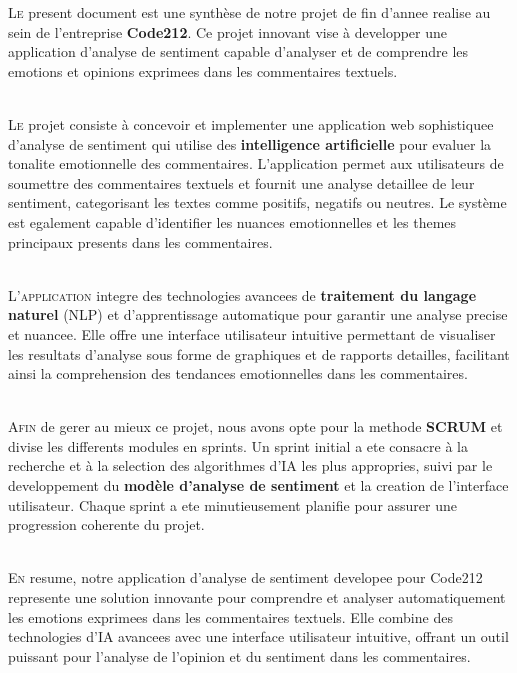 
\lettrine[nindent=0em, slope=.5em] {\color{Eblue}L}{e} present document est une synthèse de notre projet de fin d'annee realise au sein de l'entreprise \textbf{Code212}. Ce projet innovant vise à developper une application d'analyse de sentiment capable d'analyser et de comprendre les emotions et opinions exprimees dans les commentaires textuels.

\ \\

\lettrine[nindent=0em, slope=.5em] {\color{Eblue}L}{e} projet consiste à concevoir et implementer une application web sophistiquee d'analyse de sentiment qui utilise des \textbf{intelligence artificielle} pour evaluer la tonalite emotionnelle des commentaires. L'application permet aux utilisateurs de soumettre des commentaires textuels et fournit une analyse detaillee de leur sentiment, categorisant les textes comme positifs, negatifs ou neutres. Le système est egalement capable d'identifier les nuances emotionnelles et les themes principaux presents dans les commentaires.

\ \\

\lettrine[nindent=0em, slope=.5em] {\color{Eblue}L}{'application} integre des technologies avancees de \textbf{traitement du langage naturel} (NLP) et d'apprentissage automatique pour garantir une analyse precise et nuancee. Elle offre une interface utilisateur intuitive permettant de visualiser les resultats d'analyse sous forme de graphiques et de rapports detailles, facilitant ainsi la comprehension des tendances emotionnelles dans les commentaires.

\ \\

\lettrine[nindent=0em, slope=.5em] {\color{Eblue}A}{fin} de gerer au mieux ce projet, nous avons opte pour la methode \textbf{SCRUM} et divise les differents modules en sprints. Un sprint initial a ete consacre à la recherche et à la selection des algorithmes d'IA les plus appropries, suivi par le developpement du \textbf{modèle d'analyse de sentiment} et la creation de l'interface utilisateur. Chaque sprint a ete minutieusement planifie pour assurer une progression coherente du projet.

\ \\

\lettrine[nindent=0em, slope=.5em] {\color{Eblue}E}{n} resume, notre application d'analyse de sentiment developee pour Code212 represente une solution innovante pour comprendre et analyser automatiquement les emotions exprimees dans les commentaires textuels. Elle combine des technologies d'IA avancees avec une interface utilisateur intuitive, offrant un outil puissant pour l'analyse de l'opinion et du sentiment dans les commentaires.
